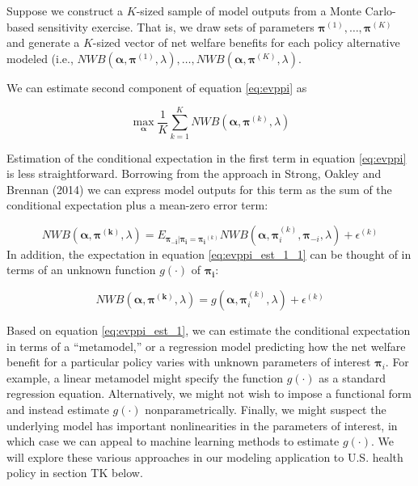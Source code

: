 \documentclass[
  10pt,
]{article}
\begin{document}
Suppose we construct a \(K\)-sized sample of model outputs from a Monte
Carlo-based sensitivity exercise. That is, we draw sets of parameters
\(\boldsymbol{\pi}^{(1)},\ldots,\boldsymbol{\pi}^{(K)}\) and generate a
\(K\)-sized vector of net welfare benefits for each policy alternative
modeled (i.e.,
\(NWB(\boldsymbol{\alpha},\boldsymbol{\pi}^{(1)},\lambda), \ldots, NWB(\boldsymbol{\alpha},\boldsymbol{\pi}^{(K)},\lambda)\).

We can estimate second component of equation \ref{eq:evppi} as

\begin{equation}
\label{eq:evppi_est_2}
\max_{\boldsymbol{\alpha}} \frac{1}{K} \sum_{k=1}^K NWB(\boldsymbol{\alpha},\boldsymbol{\pi}^{(k)},\lambda)
\end{equation}

Estimation of the conditional expectation in the first term in equation
\ref{eq:evppi} is less straightforward. Borrowing from the approach in
Strong, Oakley and Brennan (2014) we can express model outputs for this
term as the sum of the conditional expectation plus a mean-zero error
term:

\begin{equation}
\label{eq:evppi_est_1_1}
NWB(\boldsymbol{\alpha},\boldsymbol{\pi^{(k)}},\lambda)  =  E_{\boldsymbol{\pi_{-i}}|\boldsymbol{\pi_i}=\boldsymbol{\pi_i}^{(k)}}NWB(\boldsymbol{\alpha},\boldsymbol{\pi}_i^{(k)},\boldsymbol{\pi}_{-i},\lambda)  + \epsilon^{(k)}
\end{equation} In addition, the expectation in equation
\ref{eq:evppi_est_1_1} can be thought of in terms of an unknown function
\(g(\cdot)\) of \(\boldsymbol{\pi_i}\):

\begin{equation}
\label{eq:evppi_est_1}
NWB(\boldsymbol{\alpha},\boldsymbol{\pi^{(k)}},\lambda)  = g(\boldsymbol{\alpha},\boldsymbol{\pi}_i^{(k)},\lambda) + \epsilon^{(k)}
\end{equation}

Based on equation \ref{eq:evppi_est_1}, we can estimate the conditional
expectation in terms of a ``metamodel,'' or a regression model
predicting how the net welfare benefit for a particular policy varies
with unknown parameters of interest \(\boldsymbol{\pi}_i\). For example,
a linear metamodel might specify the function \(g(\cdot)\) as a standard
regression equation. Alternatively, we might not wish to impose a
functional form and instead estimate \(g(\cdot)\) nonparametrically.
Finally, we might suspect the underlying model has important
nonlinearities in the parameters of interest, in which case we can
appeal to machine learning methods to estimate \(g(\cdot)\). We will
explore these various approaches in our modeling application to U.S.
health policy in section TK below.
\end{document}

